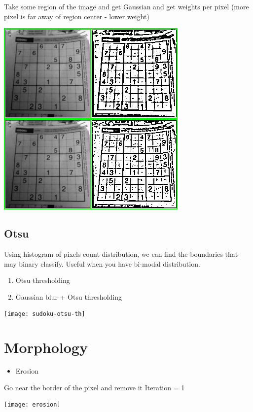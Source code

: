 \documentclass{article}
\begin{document}
    Take some region of the image and get Gaussian and get weights per pixel (more pixel is far away of region center - lower weight)

    \includegraphics[scale=0.7]{sudoku-adaptive-th}

    \subsection{Otsu}

    Using histogram of pixels count distribution, we can find the boundaries that may binary classify.
    Useful when you have bi-modal distribution.

    \begin{enumerate}
        \item Otsu thresholding
        \item Gaussian blur + Otsu thresholding
    \end{enumerate}

    \texttt{[image: sudoku-otsu-th]}

    \section{Morphology}

    \begin{itemize}
        \item Erosion
    \end{itemize}

    Go near the border of the pixel and remove it
    Iteration = 1

    \texttt{[image: erosion]}
\end{document}
